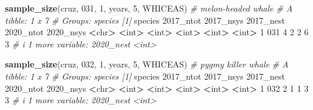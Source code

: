 \documentclass[
]{book}
\newenvironment{Shaded}{\begin{snugshade}}{\end{snugshade}}
\newcommand{\AttributeTok}[1]{\textcolor[rgb]{0.13,0.29,0.53}{#1}}
\newcommand{\CommentTok}[1]{\textcolor[rgb]{0.56,0.35,0.01}{\textit{#1}}}
\newcommand{\DecValTok}[1]{\textcolor[rgb]{0.00,0.00,0.81}{#1}}
\newcommand{\ErrorTok}[1]{\textcolor[rgb]{0.64,0.00,0.00}{\textbf{#1}}}
\newcommand{\FunctionTok}[1]{\textcolor[rgb]{0.13,0.29,0.53}{\textbf{#1}}}
\newcommand{\NormalTok}[1]{#1}
\newcommand{\SpecialCharTok}[1]{\textcolor[rgb]{0.81,0.36,0.00}{\textbf{#1}}}
\newcommand{\StringTok}[1]{\textcolor[rgb]{0.31,0.60,0.02}{#1}}
\begin{document}
\begin{Shaded}
\begin{Highlighting}[]
\FunctionTok{sample\_size}\NormalTok{(cruz, }\StringTok{\textquotesingle{}031\textquotesingle{}}\NormalTok{, }\DecValTok{1}\NormalTok{, years, }\DecValTok{5}\NormalTok{, }\StringTok{\textquotesingle{}WHICEAS\textquotesingle{}}\NormalTok{) }\CommentTok{\# melon{-}headed whale}
\CommentTok{\# A tibble: 1 x 7}
\CommentTok{\# Groups:   species [1]}
\NormalTok{  species }\StringTok{\textasciigrave{}}\AttributeTok{2017\_ntot}\StringTok{\textasciigrave{}} \StringTok{\textasciigrave{}}\AttributeTok{2017\_nsys}\StringTok{\textasciigrave{}} \StringTok{\textasciigrave{}}\AttributeTok{2017\_nest}\StringTok{\textasciigrave{}} \StringTok{\textasciigrave{}}\AttributeTok{2020\_ntot}\StringTok{\textasciigrave{}} \StringTok{\textasciigrave{}}\AttributeTok{2020\_nsys}\StringTok{\textasciigrave{}}
  \SpecialCharTok{\textless{}}\NormalTok{chr}\SpecialCharTok{\textgreater{}}         \ErrorTok{\textless{}}\NormalTok{int}\SpecialCharTok{\textgreater{}}       \ErrorTok{\textless{}}\NormalTok{int}\SpecialCharTok{\textgreater{}}       \ErrorTok{\textless{}}\NormalTok{int}\SpecialCharTok{\textgreater{}}       \ErrorTok{\textless{}}\NormalTok{int}\SpecialCharTok{\textgreater{}}       \ErrorTok{\textless{}}\NormalTok{int}\SpecialCharTok{\textgreater{}}
\DecValTok{1} \DecValTok{031}               \DecValTok{4}           \DecValTok{2}           \DecValTok{2}           \DecValTok{6}           \DecValTok{3}
\CommentTok{\# i 1 more variable: \textasciigrave{}2020\_nest\textasciigrave{} \textless{}int\textgreater{}}

\FunctionTok{sample\_size}\NormalTok{(cruz, }\StringTok{\textquotesingle{}032\textquotesingle{}}\NormalTok{, }\DecValTok{1}\NormalTok{, years, }\DecValTok{5}\NormalTok{, }\StringTok{\textquotesingle{}WHICEAS\textquotesingle{}}\NormalTok{) }\CommentTok{\# pygmy killer whale}
\CommentTok{\# A tibble: 1 x 7}
\CommentTok{\# Groups:   species [1]}
\NormalTok{  species }\StringTok{\textasciigrave{}}\AttributeTok{2017\_ntot}\StringTok{\textasciigrave{}} \StringTok{\textasciigrave{}}\AttributeTok{2017\_nsys}\StringTok{\textasciigrave{}} \StringTok{\textasciigrave{}}\AttributeTok{2017\_nest}\StringTok{\textasciigrave{}} \StringTok{\textasciigrave{}}\AttributeTok{2020\_ntot}\StringTok{\textasciigrave{}} \StringTok{\textasciigrave{}}\AttributeTok{2020\_nsys}\StringTok{\textasciigrave{}}
  \SpecialCharTok{\textless{}}\NormalTok{chr}\SpecialCharTok{\textgreater{}}         \ErrorTok{\textless{}}\NormalTok{int}\SpecialCharTok{\textgreater{}}       \ErrorTok{\textless{}}\NormalTok{int}\SpecialCharTok{\textgreater{}}       \ErrorTok{\textless{}}\NormalTok{int}\SpecialCharTok{\textgreater{}}       \ErrorTok{\textless{}}\NormalTok{int}\SpecialCharTok{\textgreater{}}       \ErrorTok{\textless{}}\NormalTok{int}\SpecialCharTok{\textgreater{}}
\DecValTok{1} \DecValTok{032}               \DecValTok{2}           \DecValTok{1}           \DecValTok{1}           \DecValTok{3}           \DecValTok{3}
\CommentTok{\# i 1 more variable: \textasciigrave{}2020\_nest\textasciigrave{} \textless{}int\textgreater{}}


\end{Highlighting}
\end{Shaded}
\end{document}
